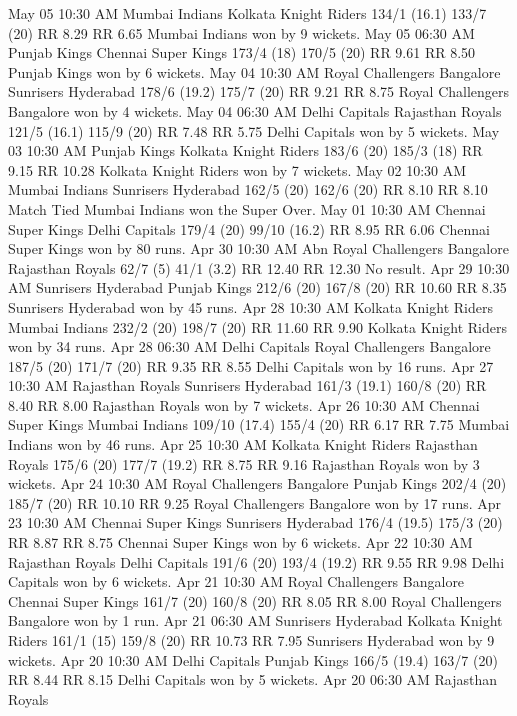 May 05
10:30 AM
Mumbai Indians
Kolkata Knight Riders
134/1 (16.1)
133/7 (20)
RR 8.29
RR 6.65
Mumbai Indians won by 9 wickets.
May 05
06:30 AM
Punjab Kings
Chennai Super Kings
173/4 (18)
170/5 (20)
RR 9.61
RR 8.50
Punjab Kings won by 6 wickets.
May 04
10:30 AM
Royal Challengers Bangalore
Sunrisers Hyderabad
178/6 (19.2)
175/7 (20)
RR 9.21
RR 8.75
Royal Challengers Bangalore won by 4 wickets.
May 04
06:30 AM
Delhi Capitals
Rajasthan Royals
121/5 (16.1)
115/9 (20)
RR 7.48
RR 5.75
Delhi Capitals won by 5 wickets.
May 03
10:30 AM
Punjab Kings
Kolkata Knight Riders
183/6 (20)
185/3 (18)
RR 9.15
RR 10.28
Kolkata Knight Riders won by 7 wickets.
May 02
10:30 AM
Mumbai Indians
Sunrisers Hyderabad
162/5 (20)
162/6 (20)
RR 8.10
RR 8.10
Match Tied Mumbai Indians won the Super Over.
May 01
10:30 AM
Chennai Super Kings
Delhi Capitals
179/4 (20)
99/10 (16.2)
RR 8.95
RR 6.06
Chennai Super Kings won by 80 runs.
Apr 30
10:30 AM
Abn
Royal Challengers Bangalore
Rajasthan Royals
62/7 (5)
41/1 (3.2)
RR 12.40
RR 12.30
No result.
Apr 29
10:30 AM
Sunrisers Hyderabad
Punjab Kings
212/6 (20)
167/8 (20)
RR 10.60
RR 8.35
Sunrisers Hyderabad won by 45 runs.
Apr 28
10:30 AM
Kolkata Knight Riders
Mumbai Indians
232/2 (20)
198/7 (20)
RR 11.60
RR 9.90
Kolkata Knight Riders won by 34 runs.
Apr 28
06:30 AM
Delhi Capitals
Royal Challengers Bangalore
187/5 (20)
171/7 (20)
RR 9.35
RR 8.55
Delhi Capitals won by 16 runs.
Apr 27
10:30 AM
Rajasthan Royals
Sunrisers Hyderabad
161/3 (19.1)
160/8 (20)
RR 8.40
RR 8.00
Rajasthan Royals won by 7 wickets.
Apr 26
10:30 AM
Chennai Super Kings
Mumbai Indians
109/10 (17.4)
155/4 (20)
RR 6.17
RR 7.75
Mumbai Indians won by 46 runs.
Apr 25
10:30 AM
Kolkata Knight Riders
Rajasthan Royals
175/6 (20)
177/7 (19.2)
RR 8.75
RR 9.16
Rajasthan Royals won by 3 wickets.
Apr 24
10:30 AM
Royal Challengers Bangalore
Punjab Kings
202/4 (20)
185/7 (20)
RR 10.10
RR 9.25
Royal Challengers Bangalore won by 17 runs.
Apr 23
10:30 AM
Chennai Super Kings
Sunrisers Hyderabad
176/4 (19.5)
175/3 (20)
RR 8.87
RR 8.75
Chennai Super Kings won by 6 wickets.
Apr 22
10:30 AM
Rajasthan Royals
Delhi Capitals
191/6 (20)
193/4 (19.2)
RR 9.55
RR 9.98
Delhi Capitals won by 6 wickets.
Apr 21
10:30 AM
Royal Challengers Bangalore
Chennai Super Kings
161/7 (20)
160/8 (20)
RR 8.05
RR 8.00
Royal Challengers Bangalore won by 1 run.
Apr 21
06:30 AM
Sunrisers Hyderabad
Kolkata Knight Riders
161/1 (15)
159/8 (20)
RR 10.73
RR 7.95
Sunrisers Hyderabad won by 9 wickets.
Apr 20
10:30 AM
Delhi Capitals
Punjab Kings
166/5 (19.4)
163/7 (20)
RR 8.44
RR 8.15
Delhi Capitals won by 5 wickets.
Apr 20
06:30 AM
Rajasthan Royals
